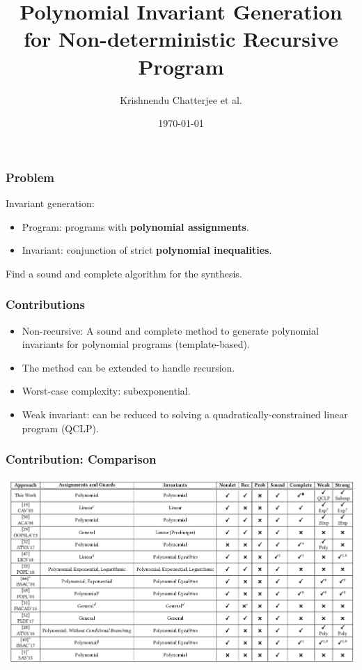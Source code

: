\documentclass[11pt]{beamer}
\title{Polynomial Invariant Generation for Non-deterministic  Recursive Program}
\author{Krishnendu Chatterjee et al.}
\date{\today}
\begin{document}
\maketitle

\begin{frame}\frametitle{Problem}

Invariant generation:
\begin{itemize}
\item Program: programs with \textbf{polynomial assignments}.


\item Invariant: conjunction of strict \textbf{polynomial inequalities}.
\end{itemize}

Find a sound and complete algorithm for the synthesis.


\end{frame}

\begin{frame}\frametitle{Contributions}

\begin{itemize}
\item Non-recursive: A sound and complete method to generate polynomial invariants for polynomial programs (template-based).
\item The method can be extended to handle recursion.
\item Worst-case complexity: subexponential.
\item Weak invariant: can be reduced to solving a quadratically-constrained linear program (QCLP).
\end{itemize}
\end{frame}

\begin{frame}\frametitle{Contribution: Comparison}
\begin{center}
\includegraphics[scale=0.26]{table.png}
\end{center}
\end{frame}
\end{document}
